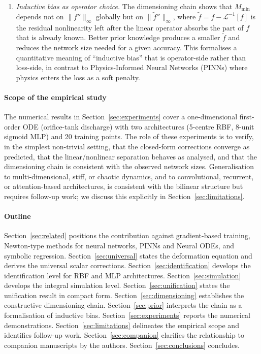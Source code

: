 \documentclass[preprint,12pt,numbers]{elsarticle}
\begin{document}
\begin{enumerate}[label=(C\arabic*),leftmargin=*]
\item \emph{Inductive bias as operator choice.} The dimensioning chain
shows that $M_{\min}$ depends not on $\|f''\|_\infty$ globally but on
$\|\tilde{f}''\|_\infty$, where $\tilde{f} = f - \mathcal{L}^{-1}[f]$
is the residual nonlinearity left after the linear operator absorbs
the part of $f$ that is already known. Better prior knowledge produces
a smaller $\tilde{f}$ and reduces the network size needed for a given
accuracy. This formalises a quantitative meaning of ``inductive bias''
that is operator-side rather than loss-side, in contrast to
Physics-Informed Neural Networks (PINNs) \cite{Raissi2019} where
physics enters the loss as a soft penalty.
\end{enumerate}

\paragraph{Scope of the empirical study} The numerical results in
Section~\ref{sec:experiments} cover a one-dimensional first-order ODE
(orifice-tank discharge) with two architectures (5-centre RBF, 8-unit
sigmoid MLP) and 20 training points. The role of these experiments is to
verify, in the simplest non-trivial setting, that the closed-form
corrections converge as predicted, that the linear/nonlinear separation
behaves as analysed, and that the dimensioning chain is consistent with
the observed network sizes. Generalisation to multi-dimensional, stiff,
or chaotic dynamics, and to convolutional, recurrent, or attention-based
architectures, is consistent with the bilinear structure but requires
follow-up work; we discuss this explicitly in
Section~\ref{sec:limitations}.

\paragraph{Outline} Section~\ref{sec:related} positions the contribution
against gradient-based training, Newton-type methods for neural networks,
PINNs and Neural ODEs, and symbolic regression.
Section~\ref{sec:universal} states the deformation equation and derives
the universal scalar corrections.
Section~\ref{sec:identification} develops the identification level for
RBF and MLP architectures.
Section~\ref{sec:simulation} develops the integral simulation level.
Section~\ref{sec:unification} states the unification result in compact
form. Section~\ref{sec:dimensioning} establishes the constructive
dimensioning chain. Section~\ref{sec:prior} interprets the chain as a
formalisation of inductive bias.
Section~\ref{sec:experiments} reports the numerical demonstrations.
Section~\ref{sec:limitations} delineates the empirical scope and
identifies follow-up work.
Section~\ref{sec:companion} clarifies the relationship to companion
manuscripts by the authors. Section~\ref{sec:conclusions} concludes.
\end{document}
